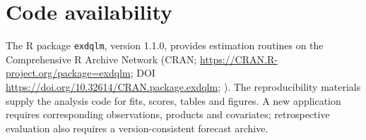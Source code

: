 \documentclass[APA,STIX1COL]{WileyNJD-v2}
\renewcommand{\thefigure}{\arabic{figure}}
\renewcommand{\thetable}{\arabic{table}}
\begin{document}
\section*{Code availability}
The R package \texttt{exdqlm}, version 1.1.0, provides estimation routines on the Comprehensive R Archive Network (CRAN; \url{https://CRAN.R-project.org/package=exdqlm}; DOI \url{https://doi.org/10.32614/CRAN.package.exdqlm}; \citealp{deleon2026exdqlm}). The reproducibility materials supply the analysis code for fits, scores, tables and figures. A new application requires corresponding observations, products and covariates; retrospective evaluation also requires a version-consistent forecast archive.

\FloatBarrier
\begin{appendix}
\makeatletter
{}
\makeatother
\renewcommand{\thefigure}{\Alph{section}\arabic{figure}}
\renewcommand{\thetable}{\Alph{section}\arabic{table}}
\renewcommand{\theequation}{\Alph{section}\arabic{equation}}
\renewcommand{\thealgorithm}{\Alph{section}\arabic{algorithm}}
\renewcommand{\theHfigure}{appendix.\Alph{section}.\arabic{figure}}
\renewcommand{\theHtable}{appendix.\Alph{section}.\arabic{table}}
\renewcommand{\theHequation}{appendix.\Alph{section}.\arabic{equation}}
\providecommand{\theHalgorithm}{}
\renewcommand{\theHalgorithm}{appendix.\Alph{section}.\arabic{algorithm}}

\FloatBarrier
\end{appendix}


\end{document}
